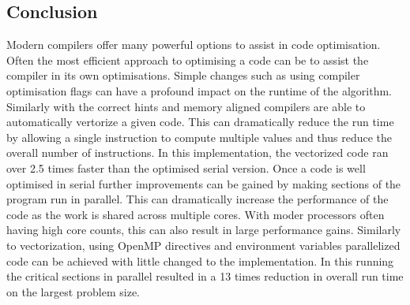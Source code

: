 \documentclass{article}
\begin{document}
\begin{multicols}{2}
\section{Conclusion}

Modern compilers offer many powerful options to assist in code optimisation.
Often the most efficient approach to optimising a code can be to assist the
compiler in its own optimisations. Simple changes such as using compiler
optimisation flags can have a profound impact on the runtime of the algorithm.
Similarly with the correct hints and memory aligned compilers are able to
automatically vertorize a given code. This can dramatically reduce the run time
by allowing a single instruction to compute multiple values and thus reduce the
overall number of instructions. In this implementation, the vectorized code ran
over 2.5 times faster than the optimised serial version. Once a code is well
optimised in serial further improvements can be gained by making sections of
the program run in parallel. This can dramatically increase the performance of
the code as the work is shared across multiple cores. With moder processors
often having high core counts, this can also result in large performance gains.
Similarly to vectorization, using OpenMP directives and environment variables
parallelized code can be achieved with little changed to the implementation. In
this running the critical sections in parallel resulted in a 13 times reduction
in overall run time on the largest problem size.

\end{multicols}
\end{document}
